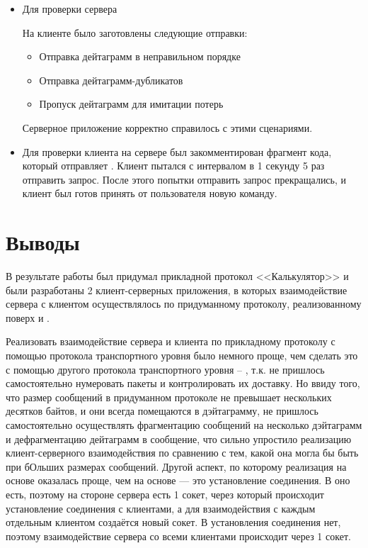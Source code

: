 \begin{itemize}
	\item Для проверки сервера
	
	На клиенте было заготовлены следующие отправки:
	
	\begin{itemize}
		\item Отправка дейтаграмм в неправильном порядке
		\item Отправка дейтаграмм-дубликатов
		\item Пропуск дейтаграмм для имитации потерь
	\end{itemize}
	
	Серверное приложение корректно справилось с этими сценариями.
	
	\item Для проверки клиента на сервере был закомментирован фрагмент кода, который отправляет . Клиент пытался с интервалом в 1 секунду 5 раз отправить запрос. После этого попытки отправить запрос прекращались, и клиент был готов принять от пользователя новую команду. 	
	
\end{itemize}

\section{Выводы}

В результате работы был придумал прикладной протокол <<Калькулятор>> и были разработаны 2 клиент-серверных приложения, в которых взаимодействие сервера с клиентом осуществлялось по придуманному протоколу, реализованному поверх  и .

Реализовать взаимодействие сервера и клиента по прикладному протоколу с помощью протокола транспортного уровня  было немного проще, чем сделать это с помощью другого протокола транспортного уровня -- , т.к. не пришлось самостоятельно нумеровать пакеты и контролировать их доставку. Но ввиду того, что размер сообщений в придуманном протоколе не превышает нескольких десятков байтов, и они всегда помещаются в  дэйтаграмму, не пришлось самостоятельно осуществлять фрагментацию сообщений на несколько дэйтаграмм и дефрагментацию дейтаграмм в сообщение, что сильно упростило реализацию клиент-серверного взаимодействия по сравнению с тем, какой она могла бы быть при бОльших размерах сообщений. Другой аспект, по которому реализация на основе  оказалась проще, чем на основе  --- это установление соединения. В  оно есть, поэтому на стороне сервера есть 1 сокет, через который происходит установление соединения с клиентами, а для взаимодействия с каждым отдельным клиентом создаётся новый сокет. В  установления соединения нет, поэтому взаимодействие сервера со всеми клиентами происходит через 1 сокет.

